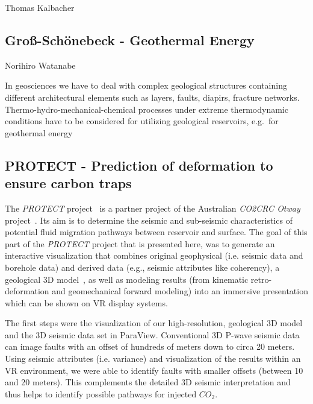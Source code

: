 \documentclass[twocolumn]{svjour3}          %
\begin{document}
Thomas Kalbacher \cite{zehner:modelcare, rink:iwas}




\subsection{Gro{\ss}-Sch\"onebeck - Geothermal Energy}
\label{grouss-schoenebeck---geothermal-energy}

Norihiro Watanabe

In geosciences we have to deal with complex geological structures containing different architectural elements such as layers, faults, diapirs, fracture networks. Thermo-hydro-mechanical-chemical processes under extreme thermodynamic conditions have to be considered for utilizing geological reservoirs, e.g.~for geothermal energy~\cite{zehner:uncertainty}

\subsection{PROTECT - Prediction of deformation to ensure carbon traps}
\label{otway-basin---co2-storage}

The \emph{PROTECT} project~\cite{krawczyk:deformation} is a partner project of the Australian \emph{CO2CRC Otway} project~\cite{cook:carbon}. Its aim is to determine the seismic and sub-seismic characteristics of potential fluid migration pathways between reservoir and surface. The goal of this part of the \emph{PROTECT} project that is presented here, was to generate an interactive visualization that combines original geophysical (i.e. seismic data and borehole data) and derived data (e.g., seismic attributes like coherency), a geological 3D model~\cite{ziesch:geology}, as well as modeling results (from kinematic retro-deformation and geomechanical forward modeling) into an immersive presentation which can be shown on VR display systems.

The first steps were the visualization of our high-resolution, geological 3D model and the 3D seismic data set in ParaView. Conventional 3D P-wave seismic data can image faults with an offset of hundreds of meters down to circa 20 meters. Using seismic attributes (i.e. variance) and visualization of the results within an VR environment, we were able to identify faults with smaller offsets (between 10 and 20 meters). This complements the detailed 3D seismic interpretation and thus helps to identify possible pathways for injected $CO_{2}$.
\end{document}
